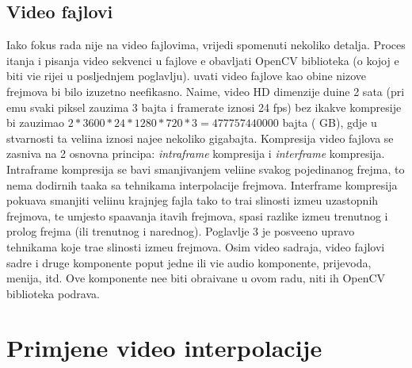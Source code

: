 \subsection{Video fajlovi}
Iako fokus rada nije na video fajlovima, vrijedi spomenuti nekoliko detalja. Proces \ch itanja i pisanja video sekvenci u fajlove \cj e obavljati OpenCV biblioteka (o kojoj \cj e biti vi\sh e rije\ch i u 
posljednjem poglavlju). \CH uvati video fajlove kao obi\ch ne nizove frejmova bi bilo izuzetno neefikasno. Naime, video HD dimenzije du\zh ine 2 sata (pri \ch emu svaki piksel zauzima 3 bajta i
framerate iznosi 24 fps) bez ikakve kompresije bi zauzimao $2 * 3600 * 24 * 1280 * 720 * 3 = 477757440000$ bajta ( GB), gdje u stvarnosti ta veli\ch ina iznosi naj\ch e\sh \cj e 
nekoliko gigabajta. Kompresija video fajlova se zasniva na 2 osnovna principa: \textit{intraframe} kompresija i \textit{interframe} kompresija. Intraframe kompresija se bavi smanjivanjem veli\ch ine
svakog pojedina\ch nog frejma, \sh to nema dodirnih ta\ch aka sa tehnikama interpolacije frejmova. Interframe kompresija poku\sh ava smanjiti veli\ch inu krajnjeg fajla tako \sh to tra\zh i sli\ch nosti
izme\dj u uzastopnih frejmova, te umjesto spa\sh avanja \ch itavih frejmova, spasi razlike izme\dj u trenutnog i pro\sh log frejma (ili trenutnog i narednog). Poglavlje 3 je posve\cj eno upravo tehnikama
koje tra\zh e sli\ch nosti izme\dj u frejmova. Osim video sadr\zh aja, video fajlovi sadr\zh e i druge komponente poput jedne ili vi\sh e audio komponente, prijevoda, menija, itd. Ove komponente
ne\cj e biti obra\dj ivane u ovom radu, niti ih OpenCV biblioteka podr\zh ava.

\section{Primjene video interpolacije}